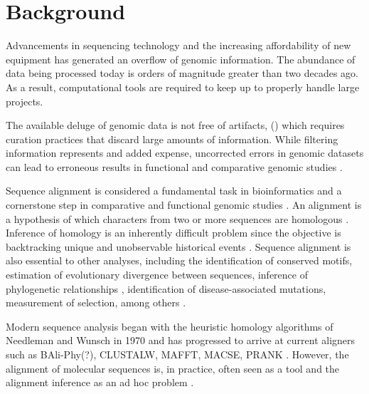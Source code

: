 \section{Background}


Advancements in sequencing technology and the increasing affordability of new
equipment has generated an overflow of genomic information.
The abundance of data being processed today is orders of magnitude greater than
two decades ago. %
As a result, computational tools are required to keep up to properly handle
large projects.

The available deluge of genomic data is not free of artifacts,
()
which requires curation practices that discard large amounts of information.
While filtering information represents and added expense, uncorrected errors in
genomic datasets can lead to erroneous results in functional and comparative
genomic studies .

Sequence alignment is considered a fundamental task in bioinformatics and a
cornerstone step in comparative and functional genomic studies
\parencite{sequence_alignment_rosenberg_2009}.
An alignment is a hypothesis of which characters from two or more sequences are
homologous \parencite{problems_cartwright_2009}.
Inference of homology is an inherently difficult problem since the objective is
backtracking unique and unobservable historical events
\parencite{sequence_aln_morrison_2010}.
Sequence alignment is also essential to other analyses, including the
identification of conserved motifs, estimation of evolutionary divergence
between sequences, inference of phylogenetic relationships
\parencite{MSA_kumar_2007}, identification of disease-associated mutations,
measurement of selection, among others
\parencite{sequence_alignment_rosenberg_2009}.

Modern sequence analysis began with the heuristic homology algorithms of
Needleman and Wunsch in 1970 \parencite{identification_smith_1981} and has
progressed to arrive at current aligners such as BAli-Phy(?), CLUSTALW, MAFFT,
MACSE, PRANK .
However, the alignment of molecular sequences is, in practice, often seen as a
tool and the alignment inference as an ad hoc problem
\parencite{morrison_MSA_2018}.

